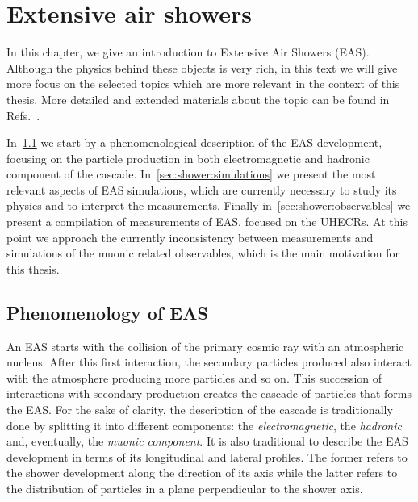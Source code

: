 \chapter[Extensive air showers]{Extensive air showers}
\label{sec:showers}


In this chapter, we give an introduction to Extensive Air Showers (EAS).
Although the physics behind these objects is very rich,
in this text we will give more focus on the selected topics
which are more relevant in the context of this thesis.
More detailed and extended materials about the topic can be found
in Refs.~\cite{GaisserBook,GriederBook}.

In~\cref{sec:showers:phen} we start by a phenomenological description
of the EAS development, focusing on the particle production in
both electromagnetic and hadronic component of the cascade. 
In~\cref{sec:shower:simulations} we present the most relevant aspects
of EAS simulations, which are currently necessary to study
its physics and to interpret the measurements.
Finally in~\cref{sec:shower:observables} we present a compilation
of measurements of EAS, focused on the UHECRs.
At this point we approach the currently inconsistency between measurements and
simulations of the muonic related observables, which is the main motivation
for this thesis.


\section{Phenomenology of EAS}
\label{sec:showers:phen}

An EAS starts with the collision of the primary cosmic ray 
with an atmospheric nucleus. After this first interaction, the secondary
particles produced also interact with the atmosphere producing more
particles and so on. This succession of interactions with secondary production
creates the cascade of particles that forms the EAS.
For the sake of clarity, the description of the cascade is traditionally
done by splitting it into different components: the \emph{electromagnetic},
the \emph{hadronic} and, eventually, the \emph{muonic component}. It is also traditional
to describe the EAS development in terms of its longitudinal and lateral profiles.
The former refers to the shower development along the direction of its axis
while the latter refers to the distribution of particles
in a plane perpendicular to the shower axis.


